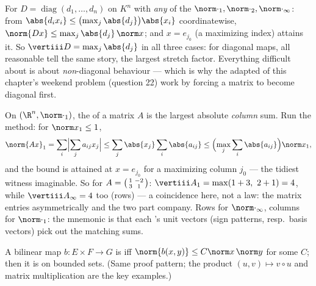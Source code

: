 \begin{example}\label{ex:b2:nvs:diagonalnorm}
For $D = \operatorname{diag}(d_1, \dots, d_n)$ on $K^n$ with
\emph{any} of the  $\norm\cdot_1, \norm\cdot_2,
\norm\cdot_\infty$: from $\abs{d_ix_i} \leq
\bigl(\max_j\abs{d_j}\bigr)\abs{x_i}$ coordinatewise,
$\norm{Dx} \leq \max_j\abs{d_j}\,\norm x$; and $x = e_{j_0}$
(a maximizing index) attains it. So $\vertiii D =
\max_j\abs{d_j}$ in all three cases: for diagonal maps, all
reasonable  tell the same story, the largest stretch
factor. Everything difficult about  is about
\emph{non}-diagonal behaviour --- which is why the adapted
 of this chapter's weekend problem (question 22) work by
forcing a matrix to become diagonal first.
\end{example}

\begin{example}\label{ex:b2:nvs:columnsums}
On $(\R^n, \norm\cdot_1)$, the  of a matrix $A$ is
the largest absolute \emph{column} sum. Run the method: for
$\norm x_1 \leq 1$,
\[
\norm{Ax}_1 = \sum_i\Bigl|\sum_j a_{ij}x_j\Bigr|
\leq \sum_j \abs{x_j}\sum_i\abs{a_{ij}}
\leq \Bigl(\max_j\sum_i\abs{a_{ij}}\Bigr)\norm x_1 ,
\]
and the bound is attained at $x = e_{j_0}$ for a maximizing
column $j_0$ --- the tidiest witness imaginable. So for $A =
\begin{psmallmatrix}1 & -2\\ 3 & 1\end{psmallmatrix}$:
$\vertiii A_1 = \max(1 + 3,\ 2 + 1) = 4$, while
$\vertiii A_\infty = 4$ too (rows) --- a coincidence here, not
a law:  the matrix entries asymmetrically and the two
 part company. Rows for $\norm\cdot_\infty$, columns for
$\norm\cdot_1$: the mnemonic is that each 's unit vectors
(sign patterns, resp.\ basis vectors) pick out the matching
sums.
\end{example}

\begin{proposition}\label{prop:b2:nvs:bilinear}
A bilinear map $b \colon E \times F \to G$ is  iff
$\norm{b(x,y)} \leq C\norm x\,\norm y$ for some $C$; then it is
 on bounded sets. (Same proof pattern; the product
$(u, v) \mapsto v \circ u$ and matrix multiplication are the key
examples.)
\end{proposition}

